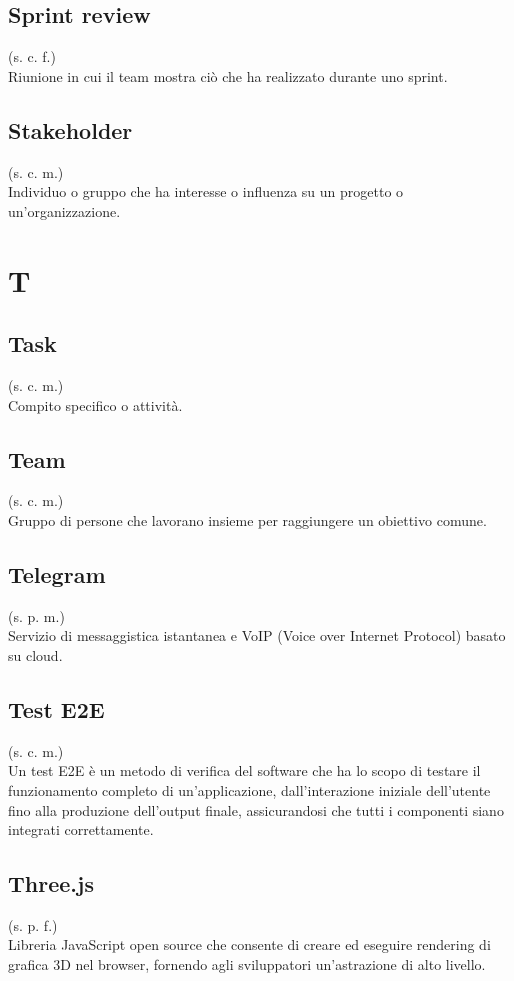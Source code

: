     \subsection{Sprint review}
    (s. c. f.)\\ 
    Riunione in cui il team mostra ciò che ha realizzato durante uno sprint.
    \subsection{Stakeholder}
    (s. c. m.)\\
    Individuo o gruppo che ha interesse o influenza su un progetto o un'organizzazione.
\pagebreak
\section{T}
    \subsection{Task}
    (s. c. m.)\\
    Compito specifico o attività.
    \subsection{Team}
    (s. c. m.)\\
    \label{Team}
    Gruppo di persone che lavorano insieme per raggiungere un obiettivo comune.
    \subsection{Telegram}
    (s. p. m.)\\
    Servizio di messaggistica istantanea e VoIP (Voice over Internet Protocol)
    basato su cloud.
    \subsection{Test E2E}
    (s. c. m.)\\
    Un test E2E è un metodo di verifica del software che ha lo scopo di testare il funzionamento completo di un'applicazione, 
    dall'interazione iniziale dell'utente fino alla produzione dell'output finale, assicurandosi che tutti i componenti siano integrati correttamente.
    \subsection{Three.js}
    (s. p. f.)\\
    Libreria JavaScript open source che consente di creare ed eseguire rendering 
    di grafica 3D nel browser, fornendo agli sviluppatori un'astrazione di alto livello.
\pagebreak
